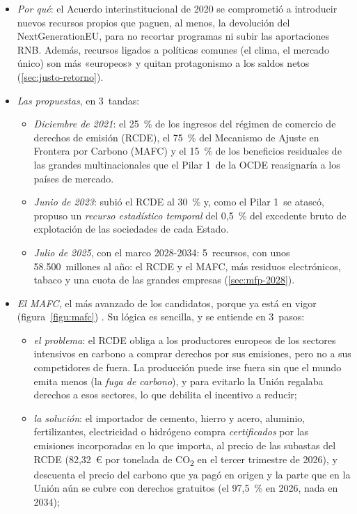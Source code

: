 \documentclass[11pt]{article}
\begin{document}
\begin{itemize}
\item \emph{Por qué}: el Acuerdo interinstitucional de 2020 se comprometió a introducir nuevos recursos propios que paguen, al menos, la devolución del NextGenerationEU, para no recortar programas ni subir las aportaciones RNB\nocite{UE2020AcuerdoInterinstitucional}. Además, recursos ligados a políticas comunes (el clima, el mercado único) son más «europeos» y quitan protagonismo a los saldos netos (\ref{sec:justo-retorno}).
\item \emph{Las propuestas}, en 3~tandas:
  \begin{itemize}
  \item \emph{Diciembre de 2021}: el 25~\% de los ingresos del régimen de comercio de derechos de emisión (RCDE), el 75~\% del Mecanismo de Ajuste en Frontera por Carbono (MAFC) y el 15~\% de los beneficios residuales de las grandes multinacionales que el Pilar 1~de la OCDE reasignaría a los países de mercado\nocite{TCE2026Dictamen}.
  \item \emph{Junio de 2023}: subió el RCDE al 30~\% y, como el Pilar 1~se atascó, propuso un \emph{recurso estadístico temporal} del 0,5~\% del excedente bruto de explotación de las sociedades de cada Estado\nocite{TCE2026Dictamen}.
  \item \emph{Julio de 2025}, con el marco 2028-2034: 5~recursos, con unos 58.500~millones al año: el RCDE y el MAFC, más residuos electrónicos, tabaco y una cuota de las grandes empresas (\ref{sec:mfp-2028}).
  \end{itemize}
\item \emph{El MAFC}, el más avanzado de los candidatos, porque ya está en vigor (figura~\ref{figu:mafc}) . Su lógica es sencilla, y se entiende en 3~pasos:
  \begin{itemize}
  \item \emph{el problema}: el RCDE obliga a los productores europeos de los sectores intensivos en carbono a comprar derechos por sus emisiones, pero no a sus competidores de fuera. La producción puede irse fuera sin que el mundo emita menos (la \emph{fuga de carbono}), y para evitarlo la Unión regalaba derechos a esos sectores, lo que debilita el incentivo a reducir;
  \item \emph{la solución}: el importador de cemento, hierro y acero, aluminio, fertilizantes, electricidad o hidrógeno compra \emph{certificados} por las emisiones incorporadas en lo que importa, al precio de las subastas del RCDE (82,32~€ por tonelada de CO\textsubscript{2} en el tercer trimestre de 2026), y descuenta el precio del carbono que ya pagó en origen y la parte que en la Unión aún se cubre con derechos gratuitos (el 97,5~\% en 2026, nada en 2034)\nocite{UE2023Reglamento956,UE2023Directiva959,CE2026PrecioCBAM};

\end{itemize}
\end{itemize}
\end{document}
